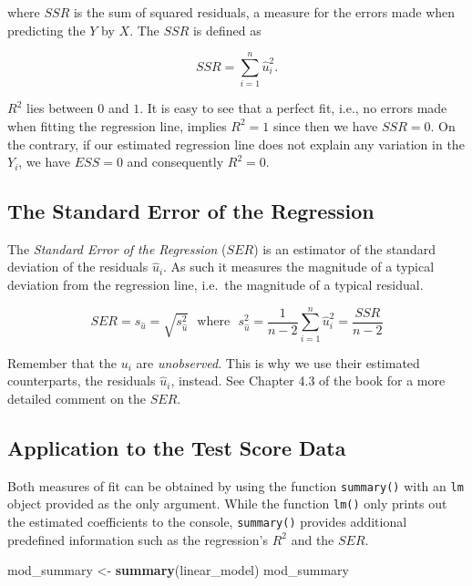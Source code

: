 \documentclass[]{book}
\newenvironment{Shaded}{\begin{snugshade}}{\end{snugshade}}
\newcommand{\KeywordTok}[1]{\textcolor[rgb]{0.13,0.29,0.53}{\textbf{#1}}}
\newcommand{\StringTok}[1]{\textcolor[rgb]{0.31,0.60,0.02}{#1}}
\newcommand{\NormalTok}[1]{#1}
\theoremstyle{definition}
\theoremstyle{definition}
\theoremstyle{definition}
\theoremstyle{remark}
\begin{document}
where \(SSR\) is the sum of squared residuals, a measure for the errors
made when predicting the \(Y\) by \(X\). The \(SSR\) is defined as

\[ SSR = \sum_{i=1}^n \hat{u}_i^2. \]

\(R^2\) lies between \(0\) and \(1\). It is easy to see that a perfect
fit, i.e., no errors made when fitting the regression line, implies
\(R^2 = 1\) since then we have \(SSR=0\). On the contrary, if our
estimated regression line does not explain any variation in the \(Y_i\),
we have \(ESS=0\) and consequently \(R^2=0\).

\subsection*{The Standard Error of the
Regression}\label{the-standard-error-of-the-regression}

The \emph{Standard Error of the Regression} (\(SER\)) is an estimator of
the standard deviation of the residuals \(\hat{u}_i\). As such it
measures the magnitude of a typical deviation from the regression line,
i.e.~the magnitude of a typical residual.

\[ SER = s_{\hat{u}} = \sqrt{s_{\hat{u}}^2} \ \ \ \text{where} \ \ \ s_{\hat{u} }^2 = \frac{1}{n-2} \sum_{i = 1}^n \hat{u}^2_i = \frac{SSR}{n - 2} \]

Remember that the \(u_i\) are \emph{unobserved}. This is why we use
their estimated counterparts, the residuals \(\hat{u}_i\), instead. See
Chapter 4.3 of the book for a more detailed comment on the \(SER\).

\subsection*{Application to the Test Score
Data}\label{application-to-the-test-score-data}

Both measures of fit can be obtained by using the function
\texttt{summary()} with an \texttt{lm} object provided as the only
argument. While the function \texttt{lm()} only prints out the estimated
coefficients to the console, \texttt{summary()} provides additional
predefined information such as the regression's \(R^2\) and the \(SER\).

\begin{Shaded}
\begin{Highlighting}[]
\NormalTok{mod_summary <-}\StringTok{ }\KeywordTok{summary}\NormalTok{(linear_model)}
\NormalTok{mod_summary}
\end{Highlighting}
\end{Shaded}
\end{document}

